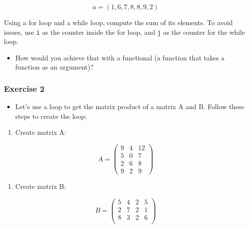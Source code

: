 \documentclass[
]{article}
\providecommand{\tightlist}{%
  \setlength{\itemsep}{0pt}\setlength{\parskip}{0pt}}
\begin{document}
\[a = (1,6,7,8,8,9,2)\]

Using a for loop and a while loop, compute the sum of its elements. To avoid issues, use \texttt{i}
as the counter inside the for loop, and \texttt{j} as the counter for the while loop.

\begin{itemize}
\tightlist
\item
  How would you achieve that with a functional (a function that takes a function as an argument)?
\end{itemize}

\hypertarget{exercise-2-3}{%
\subsubsection*{Exercise 2}\label{exercise-2-3}}

\begin{itemize}
\tightlist
\item
  Let's use a loop to get the matrix product of a matrix A and B. Follow these steps to create the loop:
\end{itemize}

\begin{enumerate}
\def\labelenumi{\arabic{enumi})}
\tightlist
\item
  Create matrix A:
\end{enumerate}

\[A = \left(
  \begin{array}{ccc}
   9 & 4 & 12 \\
   5 & 0 & 7 \\
   2 & 6 & 8 \\
   9 & 2 & 9
  \end{array} \right)
\]

\begin{enumerate}
\def\labelenumi{\arabic{enumi})}
\setcounter{enumi}{1}
\tightlist
\item
  Create matrix B:
\end{enumerate}

\[B = \left(
\begin{array}{cccc}
 5 & 4 & 2 & 5 \\
 2 & 7 & 2 & 1 \\
 8 & 3 & 2 & 6 \\
\end{array} \right)
\]
\end{document}
